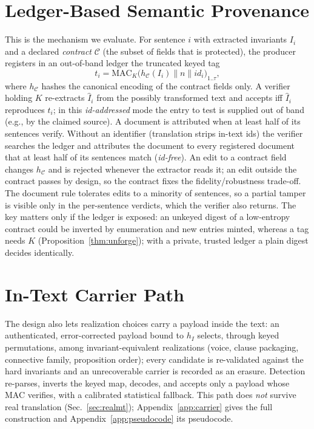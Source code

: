 \documentclass[journal]{IEEEtran}
\begin{document}
\section{Ledger-Based Semantic Provenance}
\label{sec:ledger}
This is the mechanism we evaluate. For sentence $i$ with extracted invariants $I_i$ and a declared \emph{contract} $\mathcal{C}$ (the subset of fields that is protected), the producer registers in an out-of-band ledger the truncated keyed tag
\begin{equation}
t_i=\mathrm{MAC}_K\big(h_{\mathcal{C}}(I_i)\parallel n\parallel \mathit{id}_i\big)_{1..\tau},
\label{eq:ledgertag}
\end{equation}
where $h_{\mathcal{C}}$ hashes the canonical encoding of the contract fields only. A verifier holding $K$ re-extracts $\hat I_i$ from the possibly transformed text and accepts iff $\hat I_i$ reproduces $t_i$; in this \emph{id-addressed} mode the entry to test is supplied out of band (e.g., by the claimed source). A document is attributed when at least half of its sentences verify. Without an identifier (translation strips in-text ids) the verifier searches the ledger and attributes the document to every registered document that at least half of its sentences match (\emph{id-free}). An edit to a contract field changes $h_{\mathcal{C}}$ and is rejected whenever the extractor reads it; an edit outside the contract passes by design, so the contract fixes the fidelity/robustness trade-off. The document rule tolerates edits to a minority of sentences, so a partial tamper is visible only in the per-sentence verdicts, which the verifier also returns. The key matters only if the ledger is exposed: an unkeyed digest of a low-entropy contract could be inverted by enumeration and new entries minted, whereas a tag needs $K$ (Proposition~\ref{thm:unforge}); with a private, trusted ledger a plain digest decides identically.

\section{In-Text Carrier Path}
\label{sec:validation}\label{sec:detection}
The design also lets realization choices carry a payload inside the text: an authenticated, error-corrected payload bound to $h_I$ selects, through keyed permutations, among invariant-equivalent realizations (voice, clause packaging, connective family, proposition order); every candidate is re-validated against the hard invariants and an unrecoverable carrier is recorded as an erasure. Detection re-parses, inverts the keyed map, decodes, and accepts only a payload whose MAC verifies, with a calibrated statistical fallback. This path does \emph{not} survive real translation (Sec.~\ref{sec:realmt}); Appendix~\ref{app:carrier} gives the full construction and Appendix~\ref{app:pseudocode} its pseudocode.
\end{document}
